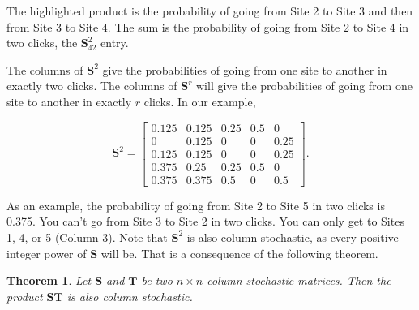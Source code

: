 \documentclass[
]{book}
\newtheorem{theorem}{Theorem}[chapter]
\theoremstyle{definition}
\theoremstyle{definition}
\theoremstyle{definition}
\theoremstyle{definition}
\theoremstyle{remark}
\begin{document}
The highlighted product is the probability of going from Site 2 to Site 3 and then from Site 3 to Site 4. The sum is the probability of going from Site 2 to Site 4 in two clicks, the \(\mathbf{S}^2_{42}\) entry.

The columns of \(\mathbf{S}^2\) give the probabilities of going from one site to another in exactly two clicks. The columns of \(\mathbf{S}^r\) will give the probabilities of going from one site to another in exactly \(r\) clicks. In our example,

\[\mathbf{S}^2=\begin{bmatrix}0.125 & 0.125 & 0.25 & 0.5 & 0\\
0 & 0.125 & 0 & 0 & 0.25\\
0.125 & 0.125 & 0 & 0 & 0.25\\
0.375 & 0.25 & 0.25 & 0.5 & 0\\
0.375 & 0.375 & 0.5 & 0 & 0.5\end{bmatrix}.\]

As an example, the probability of going from Site 2 to Site 5 in two clicks is 0.375. You can't go from Site 3 to Site 2 in two clicks. You can only get to Sites 1, 4, or 5 (Column 3). Note that \(\mathbf{S}^2\) is also column stochastic, as every positive integer power of \(\mathbf{S}\) will be. That is a consequence of the following theorem.

\begin{theorembox}

\begin{theorem}
Let \(\mathbf{S}\) and \(\mathbf{T}\) be two \(n\times n\) column stochastic matrices. Then the product \(\mathbf{ST}\) is also column stochastic.
\end{theorem}

\end{theorembox}
\end{document}
